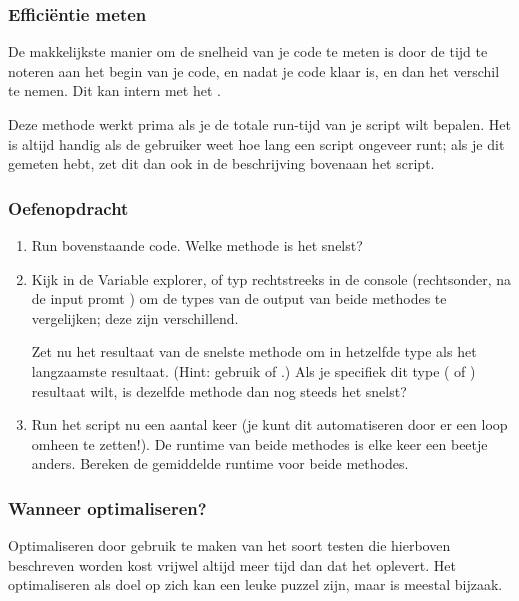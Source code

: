 \documentclass[a4paper,11pt, fleqn]{article}
\begin{document}
\subsubsection{Effici\"entie meten}
De makkelijkste manier om de snelheid van je code te meten is door de tijd te noteren aan het begin van je code, en nadat je code klaar is, en dan het verschil te nemen. Dit kan intern met het .


Deze methode werkt prima als je de totale run-tijd van je script wilt bepalen. Het is altijd handig als de gebruiker weet hoe lang een script ongeveer runt; als je dit gemeten hebt, zet dit dan ook in de beschrijving bovenaan het script.

\subsubsection*{Oefenopdracht}
\begin{enumerate}[label=(\alph*)]
\item Run bovenstaande code. Welke methode is het snelst?
\item Kijk in de Variable explorer, of typ  rechtstreeks in de console (rechtsonder, na de input promt ) om de types van de output van beide methodes te vergelijken; deze zijn verschillend.

Zet nu het resultaat van de snelste methode om in hetzelfde type als het langzaamste resultaat. (Hint: gebruik  of .) Als je specifiek dit type ( of ) resultaat wilt, is dezelfde methode dan nog steeds het snelst?
\item Run het script nu een aantal keer (je kunt dit automatiseren door er een loop omheen te zetten!). De runtime van beide methodes is elke keer een beetje anders. Bereken de gemiddelde runtime voor beide methodes.
\end{enumerate}

\subsubsection{Wanneer optimaliseren?}
Optimaliseren door gebruik te maken van het soort testen die hierboven beschreven worden kost vrijwel altijd meer tijd dan dat het oplevert. Het optimaliseren als doel op zich kan een leuke puzzel zijn, maar is meestal bijzaak.
\end{document}
